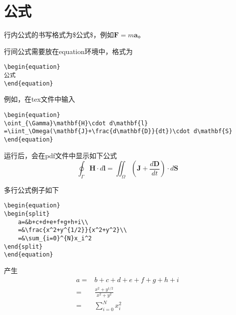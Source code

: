 \chapter{公式}

行内公式的书写格式为\${\kaishu 公式}\$，例如$\mathbf{F}=m\mathbf{a}$。

行间公式需要放在equation环境中，格式为
\begin{verbatim}
\begin{equation}
公式
\end{equation}
\end{verbatim}

例如，在tex文件中输入
\begin{verbatim}
\begin{equation}
\oint_{\Gamma}\mathbf{H}\cdot d\mathbf{l}
=\iint_\Omega(\mathbf{J}+\frac{d\mathbf{D}}{dt})\cdot d\mathbf{S}
\end{equation}
\end{verbatim}
运行后，会在pdf文件中显示如下公式
\begin{equation}
\oint_{\Gamma}\mathbf{H}\cdot d\mathbf{l}=\iint_\Omega(\mathbf{J}+\frac{d\mathbf{D}}{dt})\cdot d\mathbf{S}
\end{equation}

多行公式例子如下
\begin{verbatim}
\begin{equation}
\begin{split}
	a=&b+c+d+e+f+g+h+i\\
	=&\frac{x^2+y^{1/2}}{x^2+y^2}\\
	=&\sum_{i=0}^{N}x_i^2
\end{split}
\end{equation}
\end{verbatim}
产生
\begin{equation}
\begin{split}
a=&b+c+d+e+f+g+h+i\\
=&\frac{x^2+y^{1/2}}{x^2+y^2}\\
=&\sum_{i=0}^{N}x_i^2
\end{split}
\end{equation}
